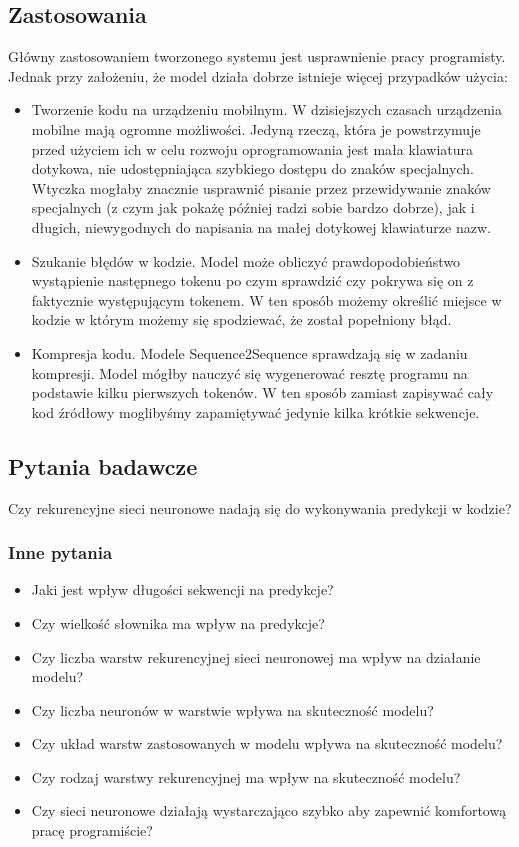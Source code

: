 \subsection {Zastosowania}
Główny zastosowaniem tworzonego systemu jest usprawnienie pracy programisty. Jednak przy założeniu, że model działa dobrze 
istnieje więcej przypadków użycia: 
\begin{itemize}
	\item Tworzenie kodu na urządzeniu mobilnym. W dzisiejszych czasach urządzenia mobilne mają ogromne możliwości. 
	Jedyną rzeczą, która je powstrzymuje przed użyciem ich w celu rozwoju oprogramowania jest mała klawiatura dotykowa, nie
	udostępniająca szybkiego dostępu do znaków specjalnych. Wtyczka mogłaby znacznie usprawnić pisanie przez przewidywanie znaków 
	specjalnych (z czym jak pokażę później radzi sobie bardzo dobrze), jak i długich, niewygodnych do napisania na małej dotykowej klawiaturze nazw.

	\item Szukanie błędów w kodzie. Model może obliczyć prawdopodobieństwo wystąpienie następnego tokenu po czym sprawdzić czy 
	pokrywa się on z faktycznie występującym tokenem. W ten sposób możemy określić miejsce w kodzie w którym możemy się 
	spodziewać, że został popełniony błąd. 

	\item Kompresja kodu. Modele Sequence2Sequence sprawdzają się w zadaniu kompresji. Model mógłby nauczyć się wygenerować resztę programu 
	na podstawie kilku pierwszych tokenów. W ten sposób zamiast zapisywać cały kod źródłowy moglibyśmy zapamiętywać jedynie kilka 
	krótkie sekwencje. 
\end{itemize}

\subsection {Pytania badawcze}
Czy rekurencyjne sieci neuronowe nadają się do wykonywania predykcji w kodzie?
\subsubsection {Inne pytania}
\label{questions}
\begin{itemize}
	\item Jaki jest wpływ długości sekwencji na predykcje? 
	\item Czy wielkość słownika ma wpływ na predykcje? 
	\item Czy liczba warstw rekurencyjnej sieci neuronowej ma wpływ na działanie modelu? 
	\item Czy liczba neuronów w warstwie wpływa na skuteczność modelu? 
	\item Czy układ warstw zastosowanych w modelu wpływa na skuteczność modelu?  
	\item Czy rodzaj warstwy rekurencyjnej ma wpływ na skuteczność modelu?
	\item Czy sieci neuronowe działają wystarczająco szybko aby zapewnić komfortową pracę programiście? 
\end{itemize} 


